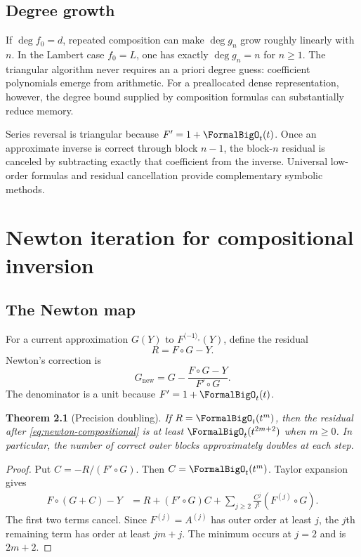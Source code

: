 \documentclass[11pt,oneside]{book}
\newtheorem{theorem}{Theorem}[chapter]
\theoremstyle{definition}
\theoremstyle{remark}
\newcommand{\compinv}{^{\langle-1\rangle_{\circ}}}
\newcommand{\compose}{\mathbin{\circ}}
\begin{document}
\section{Degree growth}
If $\deg f_0=d$, repeated composition can make $\deg g_n$ grow roughly
linearly with $n$.  In the Lambert case $f_0=L$, one has exactly
$\deg g_n=n$ for $n\ge1$.  The triangular algorithm never requires an a
priori degree guess: coefficient polynomials emerge from arithmetic.  For a
preallocated dense representation, however, the degree bound supplied by
composition formulas can substantially reduce memory.

\begin{summarybox}
Series reversal is triangular because $F'=1+\FormalBigO_t(t)$.  Once an approximate
inverse is correct through block $n-1$, the block-$n$ residual is canceled by
subtracting exactly that coefficient from the inverse.  Universal low-order
formulas and residual cancellation provide complementary symbolic methods.
\end{summarybox}


\chapter{Newton iteration for compositional inversion}
\label{ch:reversion-newton}

\section{The Newton map}
For a current approximation $G(Y)$ to $F\compinv(Y)$, define the residual
\[
 R=F\compose G-Y.
\]
Newton's correction is
\begin{equation}\label{eq:newton-compositional}
 G_{\mathrm{new}}
 =G-\frac{F\compose G-Y}{F'\compose G}.
\end{equation}
The denominator is a unit because $F'=1+\FormalBigO_t(t)$.

\begin{theorem}[Precision doubling]\label{thm:newton-doubling}
If $R=\FormalBigO_t(t^m)$, then the residual after
\eqref{eq:newton-compositional} is at least
$\FormalBigO_t(t^{2m+2})$ when $m\ge0$.  In particular, the number of correct outer
blocks approximately doubles at each step.
\end{theorem}
\begin{proof}
Put $C=-R/(F'\compose G)$.  Then $C=\FormalBigO_t(t^m)$.  Taylor expansion gives
\begin{align*}
 F\compose(G+C)-Y
 &=R+(F'\compose G)C
 +\sum_{j\ge2}\frac{C^j}{j!}(F^{(j)}\compose G).
\end{align*}
The first two terms cancel.  Since $F^{(j)}=A^{(j)}$ has outer order at least
$j$, the $j$th remaining term has order at least $jm+j$.  The minimum occurs
at $j=2$ and is $2m+2$.
\end{proof}
\end{document}

